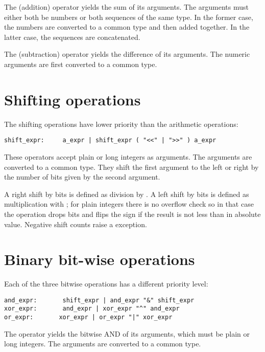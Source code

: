 The \code{+} (addition) operator yields the sum of its arguments.
The arguments must either both be numbers or both sequences of the
same type.  In the former case, the numbers are converted to a common
type and then added together.  In the latter case, the sequences are
concatenated.

The \code{-} (subtraction) operator yields the difference of its
arguments.  The numeric arguments are first converted to a common
type.

\section{Shifting operations\label{shifting}}

The shifting operations have lower priority than the arithmetic
operations:

\begin{verbatim}
shift_expr:     a_expr | shift_expr ( "<<" | ">>" ) a_expr
\end{verbatim}

These operators accept plain or long integers as arguments.  The
arguments are converted to a common type.  They shift the first
argument to the left or right by the number of bits given by the
second argument.

A right shift by  bits is defined as division by
.  A left shift by  bits is defined as
multiplication with ; for plain integers there is
no overflow check so in that case the operation drops bits and flips
the sign if the result is not less than  in absolute
value.  Negative shift counts raise a 
exception.

\section{Binary bit-wise operations\label{bitwise}}

Each of the three bitwise operations has a different priority level:

\begin{verbatim}
and_expr:       shift_expr | and_expr "&" shift_expr
xor_expr:       and_expr | xor_expr "^" and_expr
or_expr:       xor_expr | or_expr "|" xor_expr
\end{verbatim}

The \code{\&} operator yields the bitwise AND of its arguments, which
must be plain or long integers.  The arguments are converted to a
common type.

